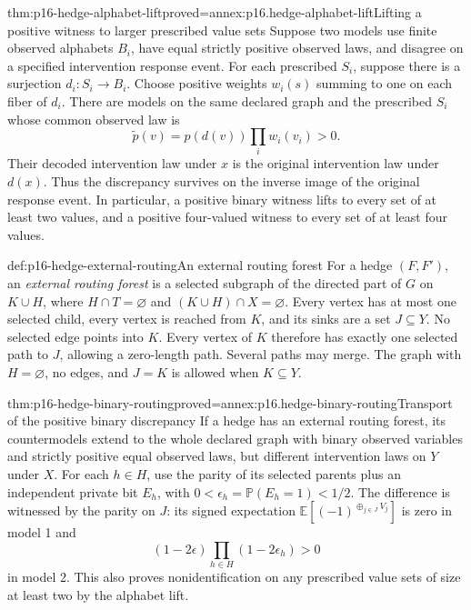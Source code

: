 \begin{hblemma}{thm:p16-hedge-alphabet-lift}{proved=annex:p16.hedge-alphabet-lift}{Lifting a positive witness to larger prescribed value sets}
Suppose two models use finite observed alphabets \(B_i\), have
equal strictly positive observed laws, and disagree on a specified
intervention response event. For each prescribed \(S_i\), suppose
there is a surjection \(d_i:S_i\to B_i\). Choose positive
weights \(w_i(s)\) summing to one on each fiber of \(d_i\).
There are models on the same declared graph and the prescribed
\(S_i\) whose common observed law is
\[
 \widetilde p(v)=p(d(v))\prod_i w_i(v_i)>0.
\]
Their decoded intervention law under \(x\) is the original
intervention law under \(d(x)\). Thus the discrepancy survives
on the inverse image of the original response event. In particular,
a positive binary witness lifts to every set of at least two values,
and a positive four-valued witness to every set of at least four values.
\end{hblemma}

\begin{hbdefinition}{def:p16-hedge-external-routing}{An external routing forest}
For a hedge \((F,F')\), an \emph{external routing forest} is a
selected subgraph of the directed part of \(G\) on \(K\cup H\),
where \(H\cap T=\varnothing\)
and \((K\cup H)\cap X=\varnothing\). Every vertex has at most
one selected child, every vertex is reached from \(K\), and
its sinks are a set \(J\subseteq Y\). No selected edge points
into \(K\). Every vertex of \(K\) therefore has exactly one
selected path to \(J\), allowing a zero-length path. Several
paths may merge. The graph with \(H=\varnothing\), no edges,
and \(J=K\) is allowed when \(K\subseteq Y\).
\end{hbdefinition}

\begin{hbtheorem}{thm:p16-hedge-binary-routing}{proved=annex:p16.hedge-binary-routing}{Transport of the positive binary discrepancy}
If a hedge has an external routing forest, its countermodels extend
to the whole declared graph with binary observed variables and
strictly positive equal observed laws, but different intervention
laws on \(Y\) under \(X\). For each \(h\in H\), use the
parity of its selected parents plus an independent private bit
\(E_h\), with \(0<\epsilon_h=\mathbb P(E_h=1)<1/2\).
The difference is witnessed by the parity on \(J\): its signed
expectation \(\mathbb E[(-1)^{\oplus_{j\in J}V_j}]\) is zero
in model 1 and
\[
 (1-2\epsilon)\prod_{h\in H}(1-2\epsilon_h)>0
\]
in model 2. This also proves nonidentification on any prescribed
value sets of size at least two by the alphabet lift.
\end{hbtheorem}

